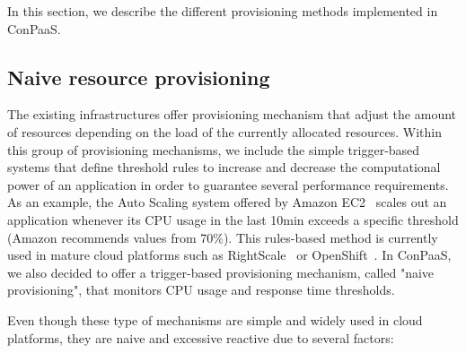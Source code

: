In this section, we describe the different provisioning methods implemented in ConPaaS.



\subsection{Naive resource provisioning}

The existing infrastructures offer provisioning mechanism that adjust the amount of resources depending on the load of the currently allocated resources. Within this group of provisioning mechanisms, we include the simple trigger-based systems that define threshold rules to increase and decrease the computational power of an application in order to guarantee several performance requirements. As an example, the Auto Scaling system offered by Amazon EC2~\cite{amazonEC2} scales out an application whenever its CPU usage in the last 10min exceeds a specific threshold (Amazon recommends values from 70\%).  This rules-based method is currently used in mature cloud platforms such as RightScale~\cite{right-scale} or OpenShift~\cite{openshift}. In ConPaaS, we also decided to offer a trigger-based provisioning mechanism, called "naive provisioning", that monitors CPU usage and response time thresholds. 


Even though these type of mechanisms are simple and widely used in cloud platforms, they are naive and excessive reactive due to several factors: 


